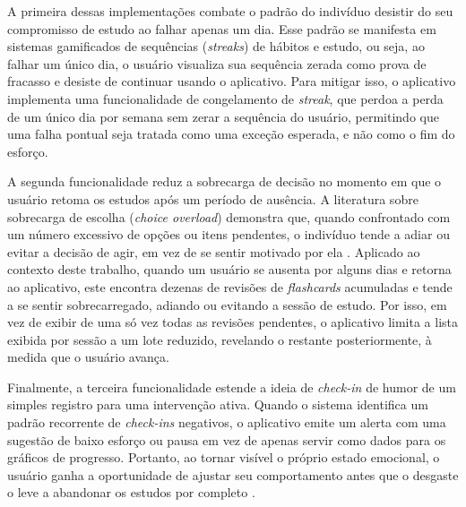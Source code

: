 A primeira dessas implementações combate o padrão do indivíduo desistir do seu compromisso de estudo ao falhar apenas um dia.
Esse padrão se manifesta em sistemas gamificados de sequências (\textit{streaks}) de hábitos e estudo, ou seja, ao falhar um único dia, o usuário visualiza sua sequência zerada como prova de fracasso e desiste de continuar usando o aplicativo.
Para mitigar isso, o aplicativo implementa uma funcionalidade de congelamento de \textit{streak}, que perdoa a perda de um único dia por semana sem zerar a sequência do usuário, permitindo que uma falha pontual seja tratada como uma exceção esperada, e não como o fim do esforço.

A segunda funcionalidade reduz a sobrecarga de decisão no momento em que o usuário retoma os estudos após um período de ausência.
A literatura sobre sobrecarga de escolha (\textit{choice overload}) demonstra que, quando confrontado com um número excessivo de opções ou itens pendentes, o indivíduo tende a adiar ou evitar a decisão de agir, em vez de se sentir motivado por ela \cite{chernev_2015}.
Aplicado ao contexto deste trabalho, quando um usuário se ausenta por alguns dias e retorna ao aplicativo, este encontra dezenas de revisões de \textit{flashcards} acumuladas e tende a se sentir sobrecarregado, adiando ou evitando a sessão de estudo.
Por isso, em vez de exibir de uma só vez todas as revisões pendentes, o aplicativo limita a lista exibida por sessão a um lote reduzido, revelando o restante posteriormente, à medida que o usuário avança.

Finalmente, a terceira funcionalidade estende a ideia de \textit{check-in} de humor de um simples registro para uma intervenção ativa.
Quando o sistema identifica um padrão recorrente de \textit{check-ins} negativos, o aplicativo emite um alerta com uma sugestão de baixo esforço ou pausa em vez de apenas servir como dados para os gráficos de progresso.
Portanto, ao tornar visível o próprio estado emocional, o usuário ganha a oportunidade de ajustar seu comportamento antes que o desgaste o leve a abandonar os estudos por completo \cite{liu_2025}.
